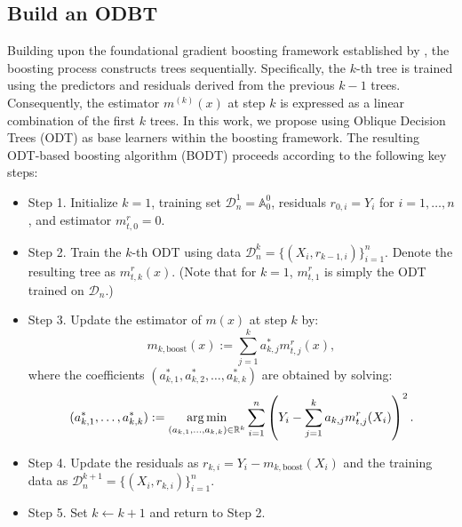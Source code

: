
\subsection{Build an ODBT}

Building upon the foundational gradient boosting framework established by \citet{friedman2001greedy}, the boosting process constructs trees sequentially. Specifically, the \(k\)-th tree is trained using the predictors and residuals derived from the previous \(k-1\) trees. Consequently, the estimator \(m^{(k)}(x)\) at step \(k\) is expressed as a linear combination of the first \(k\) trees. In this work, we propose using Oblique Decision Trees (ODT) as base learners within the boosting framework. The resulting ODT-based boosting algorithm (BODT) proceeds according to the following key steps:

\begin{itemize}
	\item Step 1. Initialize $k=1$, training set $\mathcal{D}_n^1 = \mathbb{A}^0_0$, residuals $r_{0,i} = Y_i$ for $i=1,\ldots,n$, and estimator $m_{t,0}^r = 0$.

	\item Step 2. Train the $k$-th ODT using data $\mathcal{D}_n^k = \{(X_i, r_{k-1,i})\}_{i=1}^n$. Denote the resulting tree as $m_{t,k}^r(x)$. (Note that for $k=1$, $m_{t,1}^r$ is simply the ODT trained on $\mathcal{D}_n$.)

	\item Step 3. Update the estimator of $m(x)$ at step $k$ by:
	\begin{equation}\label{eq:boost_estimator}
		m_{k,\text{boost}}(x) := \sum_{j=1}^k a_{k,j}^* m_{t,j}^r(x),
	\end{equation}
	where the coefficients $(a_{k,1}^*, a_{k,2}^*, \ldots, a_{k,k}^*)$ are obtained by solving:
	\begin{equation}\label{eq:boost_coef}
		(a_{k,1}^*,\ldots,a_{k,k}^*) := \operatorname*{arg\,min}_{(a_{k,1},\ldots,a_{k,k}) \in \mathbb{R}^k} \sum_{i=1}^n \left(Y_i - \sum_{j=1}^k a_{k,j} m_{t,j}^r(X_i)\right)^2.
	\end{equation}

	\item Step 4. Update the residuals as $r_{k,i} = Y_i - m_{k,\text{boost}}(X_i)$ and the training data as $\mathcal{D}_n^{k+1} = \{(X_i, r_{k,i})\}_{i=1}^n$.

	\item Step 5. Set $k \leftarrow k+1$ and return to Step 2.
\end{itemize}


